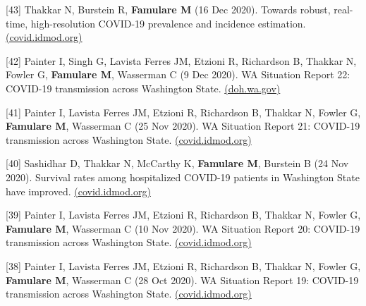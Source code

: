 \documentclass{article}
\begin{document}
\begin{llist}
\begin{items}
	\item[{[43]}] Thakkar N, Burstein R, \textbf{Famulare M} (16 Dec 2020). Towards robust, real-time, high-resolution COVID-19 prevalence and incidence estimation. \href{https://iazpvnewgrp01.blob.core.windows.net/source/2021-02/reports/pdf/Towards_robust_real_time_high_resolution_COVID_19_prevalence_and_incidence_estimation.pdf}{(covid.idmod.org)}
	
	\item[{[42]}] Painter I, Singh G, Lavista Ferres JM, Etzioni R, Richardson B, Thakkar N, Fowler G, \textbf{Famulare M}, Wasserman C (9 Dec 2020). WA Situation Report 22: COVID-19 transmission across Washington State. \href{https://www.doh.wa.gov/Portals/1/Documents/1600/coronavirus/data-tables/WA-COVID19-Situation-Report-820-114.pdf}{(doh.wa.gov)}
	
	\item[{[41]}] Painter I, Lavista Ferres JM, Etzioni R, Richardson B, Thakkar N, Fowler G, \textbf{Famulare M}, Wasserman C (25 Nov 2020). WA Situation Report 21: COVID-19 transmission across Washington State. \href{https://iazpvnewgrp01.blob.core.windows.net/source/2021-02/reports/pdf/WA_Situation_Report_21_COVID-19_transmission_across_Washington_State.pdf}{(covid.idmod.org)}
	
	\item[{[40]}] Sashidhar D, Thakkar N, McCarthy K, \textbf{Famulare M}, Burstein B (24 Nov 2020). Survival rates among hospitalized COVID-19 patients in Washington State have improved. \href{https://iazpvnewgrp01.blob.core.windows.net/source/2021-02/reports/pdf/WA_Covid_Mortality_Report.pdf}{(covid.idmod.org)}

	\item[{[39]}] Painter I, Lavista Ferres JM, Etzioni R, Richardson B, Thakkar N, Fowler G, \textbf{Famulare M}, Wasserman C (10 Nov 2020). WA Situation Report 20: COVID-19 transmission across Washington State. \href{https://iazpvnewgrp01.blob.core.windows.net/source/2021-02/reports/pdf/WA_Situation_Report_20_COVID-19_transmission_across_Washington_State.pdf}{(covid.idmod.org)}
	
	\item[{[38]}] Painter I, Lavista Ferres JM, Etzioni R, Richardson B, Thakkar N, Fowler G, \textbf{Famulare M}, Wasserman C (28 Oct 2020). WA Situation Report 19: COVID-19 transmission across Washington State. \href{https://iazpvnewgrp01.blob.core.windows.net/source/2021-02/reports/pdf/WA_Situation_Report_19_COVID-19_transmission_across_Washington_State.pdf}{(covid.idmod.org)}
	

\end{items}
\end{llist}
\end{document}
